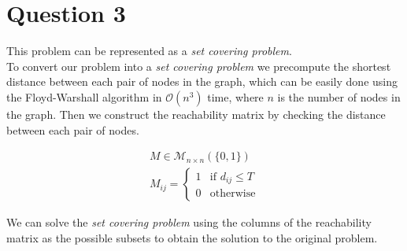 \section{Question 3}

This problem can be represented as a \textit{set covering problem}.  \\

To convert our problem into a \textit{set covering problem} we precompute the shortest distance between each pair of nodes in the graph, which can be easily done using the Floyd-Warshall algorithm in $\mathcal{O}(n^3)$ time, where $n$ is the number of nodes in the graph.
Then we construct the reachability matrix by checking the distance between each pair of nodes.

\begin{align*}
	M \in \mathcal{M}_{n \times n} (\{0, 1\})  \\
	M_{ij} = \begin{cases}
		1 & \text{if } d_{ij} \leq T \\
		0 & \text{otherwise}
	\end{cases}
\end{align*}

We can solve the \textit{set covering problem} using the columns of the reachability matrix as the possible subsets to obtain the solution to the original problem.
